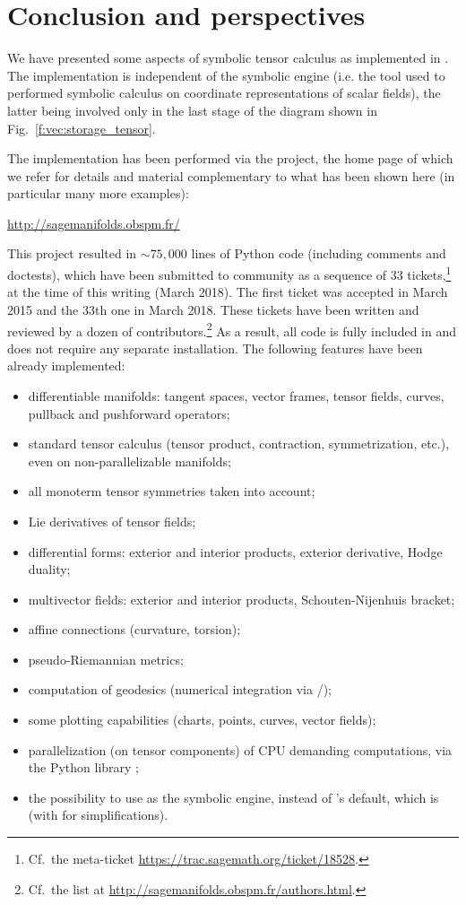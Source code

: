 \chapter{Conclusion and perspectives} \label{s:con}

We have presented some aspects of symbolic tensor calculus as implemented
in \Sage{}. The implementation is independent of the symbolic engine (i.e. the
tool used to performed symbolic calculus on coordinate representations of
scalar fields), the latter being involved only in the last stage of the diagram
shown in Fig.~\ref{f:vec:storage_tensor}.

The implementation has been performed via the 
project, the home page of which we refer for details and material complementary
to what has been shown here (in particular many more examples):
\begin{center}
\url{http://sagemanifolds.obspm.fr/}
\end{center}
This project resulted in $\sim 75,000$ lines of Python code (including comments and doctests), which have been submitted to \Sage{} community as a sequence of
33 tickets,\footnote{Cf.\ the meta-ticket \url{https://trac.sagemath.org/ticket/18528}.}
at the time of this writing (March 2018). The
first ticket was accepted in March 2015 and the 33th one in March 2018.
These tickets have been written and reviewed by a dozen of
contributors.\footnote{Cf.\ the list at \url{http://sagemanifolds.obspm.fr/authors.html}.}
As a result, all code is fully included in  and does not require
any separate installation. The following features have been already implemented:
\begin{itemize}
\item differentiable manifolds: tangent spaces, vector frames, tensor fields, curves, pullback and pushforward operators;
\item standard tensor calculus (tensor product, contraction, symmetrization, etc.), even on non-parallelizable manifolds;
\item all monoterm tensor symmetries taken into account;
\item Lie derivatives of tensor fields;
\item differential forms: exterior and interior products, exterior derivative,
Hodge duality;
\item multivector fields: exterior and interior products, Schouten-Nijenhuis bracket;
\item affine connections (curvature, torsion);
\item pseudo-Riemannian metrics;
\item computation of geodesics (numerical integration via \Sage{}/);
\item some plotting capabilities (charts, points, curves, vector fields);
\item parallelization (on tensor components) of CPU demanding computations,
via the Python library ;
\item the possibility to use  as the symbolic engine, instead of
\Sage{}'s default, which is  (with  for simplifications).
\end{itemize}
